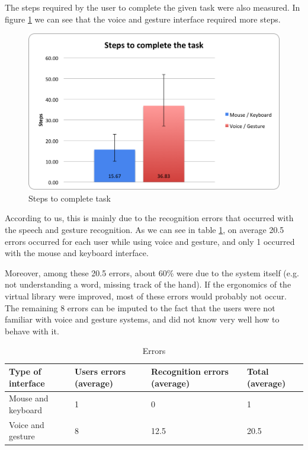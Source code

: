 \documentclass[a4paper, 10pt]{article}
\begin{document}
	\par{The steps required by the user to complete the given task were also measured. In figure \ref{fig:steptask} we can see that the voice and gesture interface required more steps. }
	
	\begin{figure}[h]
		\centering
			\includegraphics[scale=0.7]{graphs/steps_to_complete_task.png}
		\caption{Steps to complete task}
		\label{fig:steptask}
	\end{figure}
	
	\par{According to us, this is mainly due to the recognition errors that occurred with the speech and gesture recognition. As we can see in table \ref{tab:errors}, on average 20.5 errors occurred for each user while using voice and gesture, and only 1 occurred with the mouse and keyboard interface.}
	\par{Moreover, among these 20.5 errors, about 60\% were due to the system itself (e.g. not understanding a word, missing track of the hand). If the ergonomics of the virtual library were improved, most of these errors would probably not occur. The remaining 8 errors can be imputed to the fact that the users were not familiar with voice and gesture systems, and did not know very well how to behave with it.}
	
	\begin{table}
	\centering
		\begin{tabular}{| l | p{2.4cm} | p{2.4cm} | p{2.4cm} |}
			\hline
			\textbf{Type of interface} & Users errors (average) & Recognition errors (average) & Total (average)\\
			\hline
			Mouse and keyboard & 1 & 0 & 1 \\
			\hline
			Voice and gesture & 8 & 12.5 & 20.5 \\
			\hline
		\end{tabular}
		\caption{Errors}
		\label{tab:errors}
	\end{table}
	
\end{document}
